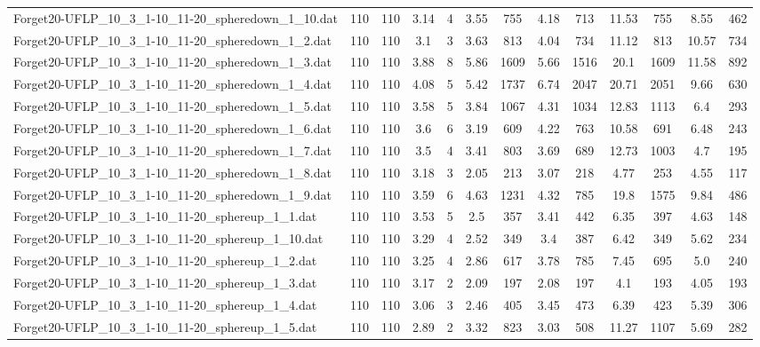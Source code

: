 \begin{table}[!ht]
{\begin{tabular}{lcccccccccccc}
Forget20-UFLP\_10\_3\_1-10\_11-20\_spheredown\_1\_10.dat & 110 & 110 & 3.14 & 4 & 3.55 & 755 & 4.18 & 713 & 11.53 & 755 & 8.55 & 462 \\
Forget20-UFLP\_10\_3\_1-10\_11-20\_spheredown\_1\_2.dat & 110 & 110 & 3.1 & 3 & 3.63 & 813 & 4.04 & 734 & 11.12 & 813 & 10.57 & 734 \\
Forget20-UFLP\_10\_3\_1-10\_11-20\_spheredown\_1\_3.dat & 110 & 110 & 3.88 & 8 & 5.86 & 1609 & 5.66 & 1516 & 20.1 & 1609 & 11.58 & 892 \\
Forget20-UFLP\_10\_3\_1-10\_11-20\_spheredown\_1\_4.dat & 110 & 110 & 4.08 & 5 & 5.42 & 1737 & 6.74 & 2047 & 20.71 & 2051 & 9.66 & 630 \\
Forget20-UFLP\_10\_3\_1-10\_11-20\_spheredown\_1\_5.dat & 110 & 110 & 3.58 & 5 & 3.84 & 1067 & 4.31 & 1034 & 12.83 & 1113 & 6.4 & 293 \\
Forget20-UFLP\_10\_3\_1-10\_11-20\_spheredown\_1\_6.dat & 110 & 110 & 3.6 & 6 & 3.19 & 609 & 4.22 & 763 & 10.58 & 691 & 6.48 & 243 \\
Forget20-UFLP\_10\_3\_1-10\_11-20\_spheredown\_1\_7.dat & 110 & 110 & 3.5 & 4 & 3.41 & 803 & 3.69 & 689 & 12.73 & 1003 & 4.7 & 195 \\
Forget20-UFLP\_10\_3\_1-10\_11-20\_spheredown\_1\_8.dat & 110 & 110 & 3.18 & 3 & 2.05 & 213 & 3.07 & 218 & 4.77 & 253 & 4.55 & 117 \\
Forget20-UFLP\_10\_3\_1-10\_11-20\_spheredown\_1\_9.dat & 110 & 110 & 3.59 & 6 & 4.63 & 1231 & 4.32 & 785 & 19.8 & 1575 & 9.84 & 486 \\
Forget20-UFLP\_10\_3\_1-10\_11-20\_sphereup\_1\_1.dat & 110 & 110 & 3.53 & 5 & 2.5 & 357 & 3.41 & 442 & 6.35 & 397 & 4.63 & 148 \\
Forget20-UFLP\_10\_3\_1-10\_11-20\_sphereup\_1\_10.dat & 110 & 110 & 3.29 & 4 & 2.52 & 349 & 3.4 & 387 & 6.42 & 349 & 5.62 & 234 \\
Forget20-UFLP\_10\_3\_1-10\_11-20\_sphereup\_1\_2.dat & 110 & 110 & 3.25 & 4 & 2.86 & 617 & 3.78 & 785 & 7.45 & 695 & 5.0 & 240 \\
Forget20-UFLP\_10\_3\_1-10\_11-20\_sphereup\_1\_3.dat & 110 & 110 & 3.17 & 2 & 2.09 & 197 & 2.08 & 197 & 4.1 & 193 & 4.05 & 193 \\
Forget20-UFLP\_10\_3\_1-10\_11-20\_sphereup\_1\_4.dat & 110 & 110 & 3.06 & 3 & 2.46 & 405 & 3.45 & 473 & 6.39 & 423 & 5.39 & 306 \\
Forget20-UFLP\_10\_3\_1-10\_11-20\_sphereup\_1\_5.dat & 110 & 110 & 2.89 & 2 & 3.32 & 823 & 3.03 & 508 & 11.27 & 1107 & 5.69 & 282 \\

\end{tabular}}
\end{table}
